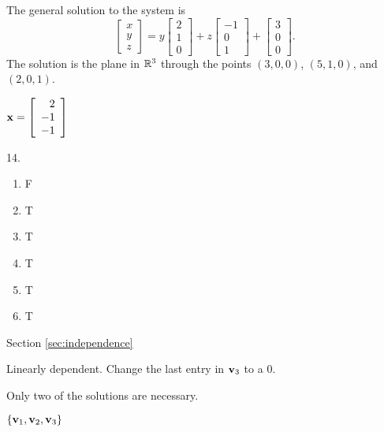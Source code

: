 \begin{multicols}{2}
\item The general solution to the system is 
\[\left[ \begin{array}{c} x\\y\\z \end{array} \right]  = y \left[ \begin{array}{c} 2\\1\\0 \end{array} \right] + z \left[ \begin{array}{r} -1\\0\\1 \end{array} \right] +  \left[ \begin{array}{c} 3\\0\\0 \end{array} \right].\] 
The solution is the plane in $\mathbb{R}^3$ through the points $(3,0,0)$, $(5,1,0)$, and $(2,0,1)$. 

\item $\mathbf{x} = \left[ \begin{array}{r} 2\\-1\\-1 \end{array} \right]$ 

\oee

\be
\item[14.] 
\begin{enumerate}[label=(\alph*), leftmargin=1\parindent]
\item F
\item T
\item T
\item T
\item T
\item T
\end{enumerate}
\ee

\hspace{-0.25in} Section \ref{sec:independence}

\obe

\item Linearly dependent. Change the last entry in $\mathbf{v}_3$ to a $0$.

\item Only two of the solutions are necessary. 

\item 
	\ba
	\item  $\{\mathbf{v}_1, \mathbf{v}_2, \mathbf{v}_3\}$ 


\end{multicols}
